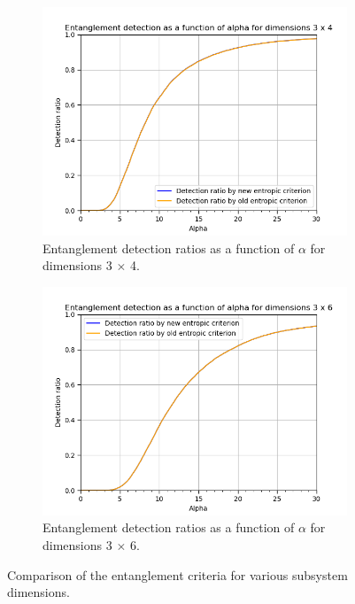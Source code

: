 \begin{figure}[ht]
\begin{subfigure}[b]{0.5\linewidth}
    \label{fig:renyi_3x3} 
    \vspace{2ex}
  \end{subfigure} 
  \begin{subfigure}[b]{0.5\linewidth}
    \centering
    \includegraphics[width=\linewidth]{images/renyi_comparison_3_4_30_0.2.png} 
    \caption{Entanglement detection ratios as a function of $\alpha$ for dimensions 3 $\times$ 4.} 
    \label{fig:renyi_3x4} 
  \end{subfigure}%
  \begin{subfigure}[b]{0.5\linewidth}
    \centering
    \includegraphics[width=\linewidth]{images/renyi_comparison_3_6_30_0.2.png} 
    \caption{Entanglement detection ratios as a function of $\alpha$ for dimensions 3 $\times$ 6.} 
    \label{fig:renyi_3x6} 
  \end{subfigure} 
  \caption{Comparison of the entanglement criteria for various subsystem dimensions.}
  \label{fig:renyi_comparison} 
\end{figure}

